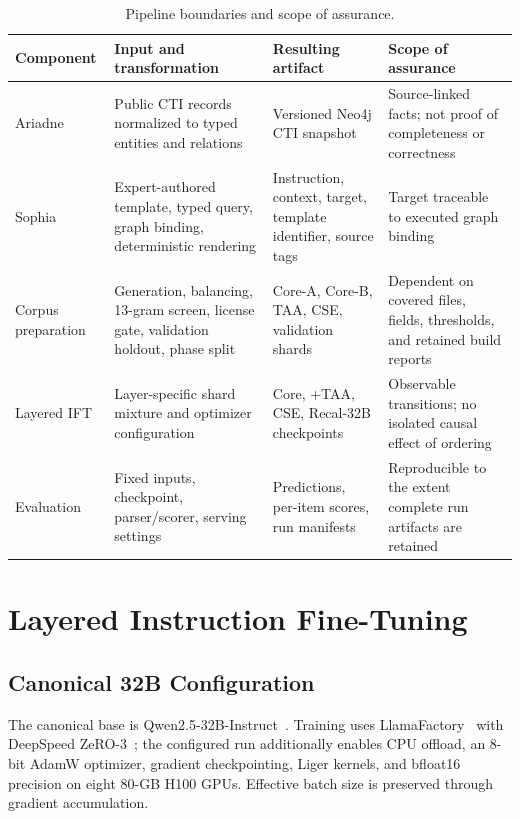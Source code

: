 \documentclass[conference]{IEEEtran}
\begin{document}
\begin{table}[t]
\caption{Pipeline boundaries and scope of assurance.}
\label{tab:boundaries}
\centering
\scriptsize
\setlength{\tabcolsep}{4pt}
\begin{tabular}{@{}p{}p{}p{}p{}@{}}
\toprule
Component & Input and transformation & Resulting artifact & Scope of assurance \\
\midrule
Ariadne & Public CTI records normalized to typed entities and relations & Versioned Neo4j CTI snapshot & Source-linked facts; not proof of completeness or correctness \\
Sophia & Expert-authored template, typed query, graph binding, deterministic rendering & Instruction, context, target, template identifier, source tags & Target traceable to executed graph binding \\
Corpus preparation & Generation, balancing, 13-gram screen, license gate, validation holdout, phase split & Core-A, Core-B, TAA, CSE, validation shards & Dependent on covered files, fields, thresholds, and retained build reports \\
Layered IFT & Layer-specific shard mixture and optimizer configuration & Core, +TAA, CSE, Recal-32B checkpoints & Observable transitions; no isolated causal effect of ordering \\
Evaluation & Fixed inputs, checkpoint, parser/scorer, serving settings & Predictions, per-item scores, run manifests & Reproducible to the extent complete run artifacts are retained \\
\bottomrule
\end{tabular}
\end{table}

\section{Layered Instruction Fine-Tuning}
\subsection{Canonical 32B Configuration}
The canonical base is Qwen2.5-32B-Instruct~\cite{qwen25}. Training uses LlamaFactory~\cite{zheng2024llamafactory} with DeepSpeed ZeRO-3~\cite{rajbhandari2020zero}; the configured run additionally enables CPU offload, an 8-bit AdamW optimizer, gradient checkpointing, Liger kernels, and bfloat16 precision on eight 80-GB H100 GPUs. Effective batch size is preserved through gradient accumulation.
\end{document}
